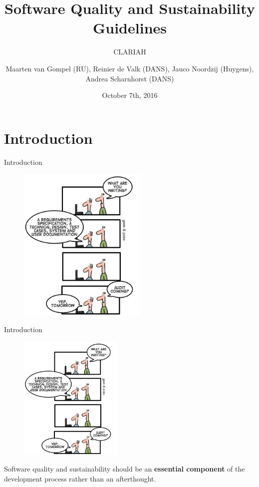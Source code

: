 \documentclass[compress]{beamer}
\title{Software Quality and Sustainability Guidelines}
\subtitle{CLARIAH}
\author{Maarten van Gompel (RU), Reinier de Valk (DANS), Jauco Noordzij (Huygens), Andrea Scharnhorst (DANS)}
\date{October 7th, 2016}
\begin{document}
\begin{frame}
\maketitle
\end{frame}

\section{Introduction}

\begin{frame}{Introduction}


\begin{figure}
\includegraphics[height=7.5cm]{img/intro.jpg}
\end{figure}

\end{frame}

\begin{frame}{Introduction}

\begin{figure}
\includegraphics[height=6cm]{img/intro.jpg}
\end{figure}
\begin{center}
Software quality and sustainability should be an \textbf{essential component}
of the development process rather than an afterthought.
\end{center}
\end{frame}
\end{document}
